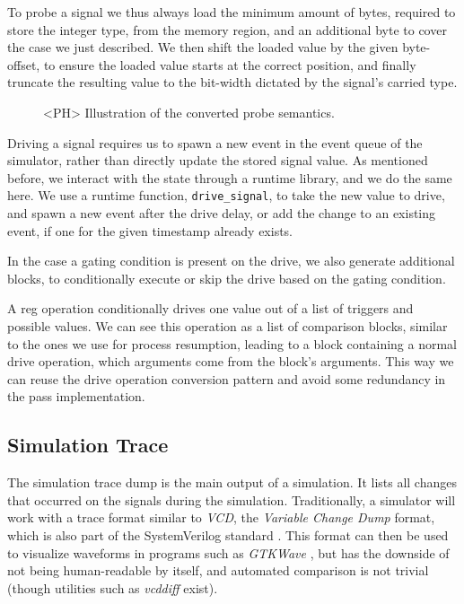 To probe a signal we thus always load the minimum amount of bytes, required to store the integer type, from the memory region, and an additional byte to cover the case we just described. We then shift the loaded value by the given byte-offset, to ensure the loaded value starts at the correct position, and finally truncate the resulting value to the bit-width dictated by the signal's carried type.

\begin{figure}[ht]
    \caption{<PH> Illustration of the converted probe semantics.}
\end{figure}

Driving a signal requires us to spawn a new event in the event queue of the simulator, rather than directly update the stored signal value. As mentioned before, we interact with the state through a runtime library, and we do the same here. We use a runtime function, \texttt{drive\_signal}, to take the new value to drive, and spawn a new event after the drive delay, or add the change to an existing event, if one for the given timestamp already exists.

In the case a gating condition is present on the drive, we also generate additional blocks, to conditionally execute or skip the drive based on the gating condition.

A reg operation conditionally drives one value out of a list of triggers and possible values. We can see this operation as a list of comparison blocks, similar to the ones we use for process resumption, leading to a block containing a normal drive operation, which arguments come from the block's arguments. This way we can reuse the drive operation conversion pattern and avoid some redundancy in the pass implementation.





\subsection{Simulation Trace}
\label{sec:trace}
The simulation trace dump is the main output of a simulation. It lists all changes that occurred on the signals during the simulation. Traditionally, a simulator will work with a trace format similar to \textit{VCD}, the \textit{Variable Change Dump} format, which is also part of the SystemVerilog standard \cite{SV2018}. This format can then be used to visualize waveforms in programs such as \textit{GTKWave} \cite{gtkwave}, but has the downside of not being human-readable by itself, and automated comparison is not trivial (though utilities such as \textit{vcddiff} \cite{vcddiff} exist).

